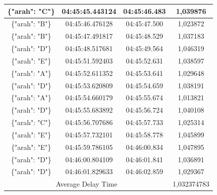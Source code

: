 \begin{table}[htpb]
\begin{tabular}{|ccc|c|}
  \multicolumn{1}{|c|}{\{"arah": "C"\}} & \multicolumn{1}{c|}{04:45:45.443124} & 04:45:46.483       & 1,039876    \\ \hline
  \multicolumn{1}{|c|}{\{"arah": "B"\}} & \multicolumn{1}{c|}{04:45:46.476128} & 04:45:47.500       & 1,023872    \\ \hline
  \multicolumn{1}{|c|}{\{"arah": "B"\}} & \multicolumn{1}{c|}{04:45:47.491817} & 04:45:48.529       & 1,037183    \\ \hline
  \multicolumn{1}{|c|}{\{"arah": "D"\}} & \multicolumn{1}{c|}{04:45:48.517681} & 04:45:49.564       & 1,046319    \\ \hline
  \multicolumn{1}{|c|}{\{"arah": "E"\}} & \multicolumn{1}{c|}{04:45:51.592403} & 04:45:52.631       & 1,038597    \\ \hline
  \multicolumn{1}{|c|}{\{"arah": "A"\}} & \multicolumn{1}{c|}{04:45:52.611352} & 04:45:53.641       & 1,029648    \\ \hline
  \multicolumn{1}{|c|}{\{"arah": "D"\}} & \multicolumn{1}{c|}{04:45:53.620809} & 04:45:54.659       & 1,038191    \\ \hline
  \multicolumn{1}{|c|}{\{"arah": "A"\}} & \multicolumn{1}{c|}{04:45:54.660179} & 04:45:55.674       & 1,013821    \\ \hline
  \multicolumn{1}{|c|}{\{"arah": "D"\}} & \multicolumn{1}{c|}{04:45:55.683892} & 04:45:56.724       & 1,040108    \\ \hline
  \multicolumn{1}{|c|}{\{"arah": "C"\}} & \multicolumn{1}{c|}{04:45:56.707686} & 04:45:57.733       & 1,025314    \\ \hline
  \multicolumn{1}{|c|}{\{"arah": "E"\}} & \multicolumn{1}{c|}{04:45:57.732101} & 04:45:58.778       & 1,045899    \\ \hline
  \multicolumn{1}{|c|}{\{"arah": "E"\}} & \multicolumn{1}{c|}{04:45:59.786105} & 04:46:00.834       & 1,047895    \\ \hline
  \multicolumn{1}{|c|}{\{"arah": "D"\}} & \multicolumn{1}{c|}{04:46:00.804109} & 04:46:01.841       & 1,036891    \\ \hline
  \multicolumn{1}{|c|}{\{"arah": "D"\}} & \multicolumn{1}{c|}{04:46:01.829633} & 04:46:02.859       & 1,029367    \\ \hline
  \multicolumn{3}{|c|}{Average Delay Time}                                                          & 1,032374783 \\ \hline
  \end{tabular}
  \end{table}

